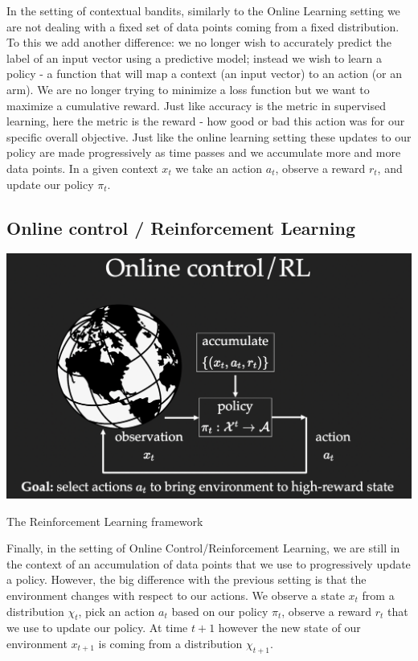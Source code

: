 In the setting of contextual bandits, similarly to the Online Learning setting we are not dealing with a fixed set of data points coming from a fixed distribution. To this we add another difference: we no longer wish to accurately predict the label of an input vector using a predictive model; instead we wish to learn a policy - a function that will map a context (an input vector) to an action (or an arm). We are no longer trying to minimize a loss function but we want to maximize a cumulative reward. Just like accuracy is the metric in supervised learning, here the metric is the reward - how good or bad this action was for our specific overall objective. Just like the online learning setting these updates to our policy are made progressively as time passes and we accumulate more and more data points. In a given context $x_t$ we take an action $a_t$, observe a reward $r_t$, and update our policy $\pi_t$.

\subsection*{Online control / Reinforcement Learning}

\begin{marginfigure}%
  \includegraphics[width=\linewidth]{Online_control.png}
\caption{The Reinforcement Learning framework}
  \label{fig:reinforcement_learning_framework}
\end{marginfigure}

Finally, in the setting of Online Control/Reinforcement Learning, we are still in the context of an accumulation of data points that we use to progressively update a policy. However, the big difference with the previous setting is that the environment changes with respect to our actions. We observe a state $x_t$ from a distribution $\chi_t$, pick an action $a_t$ based on our policy $\pi_t$, observe a reward $r_t$ that we use to update our policy. At time $t+1$ however the new state of our environment $x_{t+1}$ is coming from a distribution $\chi_{t+1}$.

